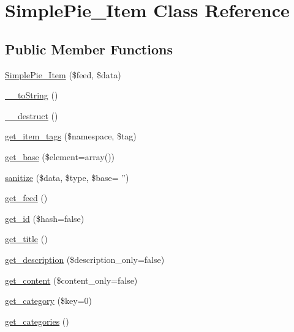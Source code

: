\hypertarget{class_simple_pie___item}{\section{Simple\-Pie\-\_\-\-Item Class Reference}
\label{class_simple_pie___item}
}
\subsection*{Public Member Functions}
\begin{DoxyCompactItemize}
\item 
\hyperlink{class_simple_pie___item_a4b3c42931f90c1d72140a3709db438d2}{Simple\-Pie\-\_\-\-Item} (\$feed, \$data)
\item 
\hyperlink{class_simple_pie___item_aef80fa1973afe13e80ff5d2f052a2193}{\-\_\-\-\_\-to\-String} ()
\item 
\hyperlink{class_simple_pie___item_ad80fe0e807c4fc60759b4f9571c746a2}{\-\_\-\-\_\-destruct} ()
\item 
\hyperlink{class_simple_pie___item_a147e30a0e74399bbd3fce9accc7dae86}{get\-\_\-item\-\_\-tags} (\$namespace, \$tag)
\item 
\hyperlink{class_simple_pie___item_a26780d7238af1876e2cd4a0877863eec}{get\-\_\-base} (\$element=array())
\item 
\hyperlink{class_simple_pie___item_ac22099c64b2dcb63ffebb3b5ddfb9c22}{sanitize} (\$data, \$type, \$base= '')
\item 
\hyperlink{class_simple_pie___item_ac735282de58daefe7e1318dd208d9e1d}{get\-\_\-feed} ()
\item 
\hyperlink{class_simple_pie___item_a6596252b436df0321af62bb06ee53477}{get\-\_\-id} (\$hash=false)
\item 
\hyperlink{class_simple_pie___item_a09c093da3afef6ad58788adac78d2eb2}{get\-\_\-title} ()
\item 
\hyperlink{class_simple_pie___item_a465369bd297a3461e7b8bef4ee488679}{get\-\_\-description} (\$description\-\_\-only=false)
\item 
\hyperlink{class_simple_pie___item_ada3ceebbe495f03a1ecf47a6f14fa8ea}{get\-\_\-content} (\$content\-\_\-only=false)
\item 
\hyperlink{class_simple_pie___item_a7fb10be91de11904640428d963a4f8ac}{get\-\_\-category} (\$key=0)
\item 
\hyperlink{class_simple_pie___item_a9d708a667e1a321b88ac607cddd0c7fa}{get\-\_\-categories} ()
\item 

\end{DoxyCompactItemize}
